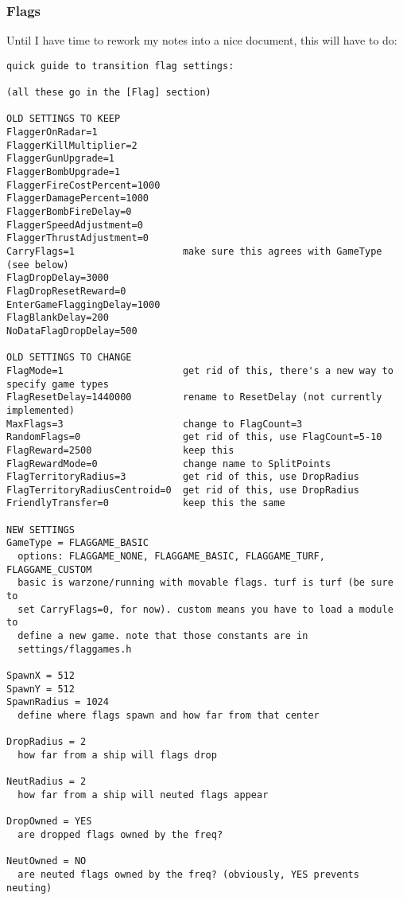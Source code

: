 \documentclass{article}
\begin{document}
\subsubsection{Flags}

Until I have time to rework my notes into a nice document, this will
have to do:

\begin{verbatim}
quick guide to transition flag settings:

(all these go in the [Flag] section)

OLD SETTINGS TO KEEP
FlaggerOnRadar=1
FlaggerKillMultiplier=2
FlaggerGunUpgrade=1
FlaggerBombUpgrade=1
FlaggerFireCostPercent=1000
FlaggerDamagePercent=1000
FlaggerBombFireDelay=0
FlaggerSpeedAdjustment=0
FlaggerThrustAdjustment=0
CarryFlags=1                   make sure this agrees with GameType (see below)
FlagDropDelay=3000
FlagDropResetReward=0
EnterGameFlaggingDelay=1000
FlagBlankDelay=200
NoDataFlagDropDelay=500

OLD SETTINGS TO CHANGE
FlagMode=1                     get rid of this, there's a new way to specify game types
FlagResetDelay=1440000         rename to ResetDelay (not currently implemented)
MaxFlags=3                     change to FlagCount=3
RandomFlags=0                  get rid of this, use FlagCount=5-10
FlagReward=2500                keep this
FlagRewardMode=0               change name to SplitPoints
FlagTerritoryRadius=3          get rid of this, use DropRadius
FlagTerritoryRadiusCentroid=0  get rid of this, use DropRadius
FriendlyTransfer=0             keep this the same

NEW SETTINGS
GameType = FLAGGAME_BASIC
  options: FLAGGAME_NONE, FLAGGAME_BASIC, FLAGGAME_TURF, FLAGGAME_CUSTOM
  basic is warzone/running with movable flags. turf is turf (be sure to
  set CarryFlags=0, for now). custom means you have to load a module to
  define a new game. note that those constants are in
  settings/flaggames.h

SpawnX = 512
SpawnY = 512
SpawnRadius = 1024
  define where flags spawn and how far from that center

DropRadius = 2
  how far from a ship will flags drop

NeutRadius = 2
  how far from a ship will neuted flags appear

DropOwned = YES
  are dropped flags owned by the freq?

NeutOwned = NO
  are neuted flags owned by the freq? (obviously, YES prevents neuting)
\end{verbatim}
\end{document}
